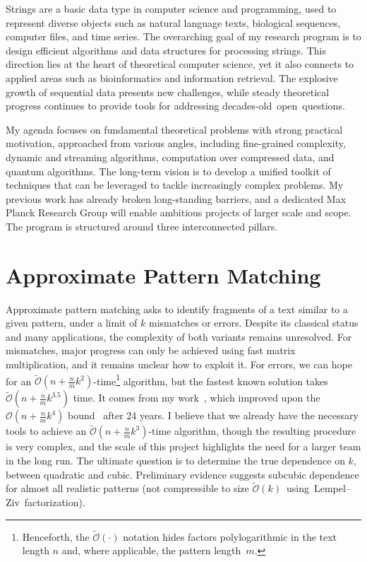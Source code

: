 \documentclass[a4paper,11pt]{article}
\newcommand{\Oh}{\mathcal{O}}
\newcommand{\Ohtilde}{\tilde{\mathcal{O}}}
\begin{document}
\thispagestyle{firststyle}
Strings are a basic data type in computer science and programming, used to represent diverse objects such as natural language texts, biological sequences, computer files, and time series.
The overarching goal of my research program is to design efficient algorithms and data structures for processing strings.
This direction lies at the heart of theoretical computer science, yet it also connects to applied areas such as bioinformatics and information retrieval.
The explosive growth of sequential data presents new challenges, while steady theoretical progress continues to provide tools for addressing \mbox{decades-old open questions}.

My agenda focuses on fundamental theoretical problems with strong practical motivation, approached from various angles, including fine-grained complexity, dynamic and streaming algorithms, computation over compressed data, and quantum algorithms.
The long-term vision is to develop a unified toolkit of techniques that can be leveraged to tackle increasingly complex problems. 
My previous work has already broken long-standing barriers, and a dedicated Max Planck Research Group will enable ambitious projects of larger scale and scope. 
The program is structured around three interconnected pillars.

\section{Approximate Pattern Matching}

Approximate pattern matching asks to identify fragments of a text similar to a given pattern, under a limit of $k$ mismatches or errors. 
Despite its classical status and many applications, the complexity of both variants remains unresolved. 
For mismatches, major progress can only be achieved using fast matrix multiplication, and it remains unclear how to exploit it. 
For errors, we can hope for an $\Ohtilde(n+\tfrac{n}{m}k^{2})$-time\footnote{Henceforth, the $\Ohtilde(\cdot)$ notation hides factors polylogarithmic in the text length $n$ and, where applicable, the pattern length~$m$.} algorithm, but the fastest known solution takes $\Ohtilde(n+\tfrac{n}{m}k^{3.5})$ time. 
It comes from my work~\cite{CKW22}, which improved upon the $\Oh(n+\tfrac{n}{m}k^4)$ bound~\cite{CH98} after 24 years.  
I believe that we already have the necessary tools to achieve an $\Ohtilde(n+\tfrac{n}{m}k^{3})$-time algorithm, though the resulting procedure is very complex, and the scale of this project highlights the need for a larger team in the long run.
The ultimate question is to determine the true dependence on $k$, between quadratic and cubic. 
Preliminary evidence suggests subcubic dependence for almost all realistic patterns (not compressible to size \mbox{$\Ohtilde(k)$ using Lempel--Ziv factorization}). 
\end{document}
